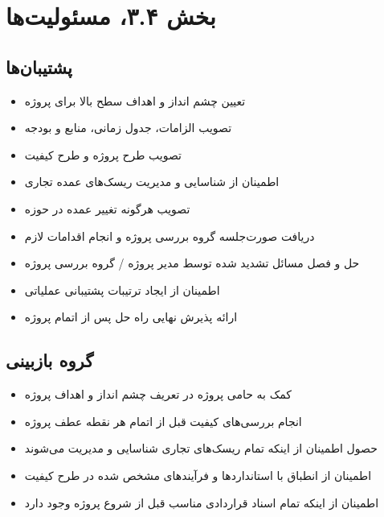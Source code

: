 \chapter{بخش ۳.۴، مسئولیت‌ها}

\section{پشتیبان‌ها}
\begin{itemize}
\item تعیین چشم انداز و اهداف سطح بالا برای پروژه
\item تصویب الزامات، جدول زمانی، منابع و بودجه
\item تصویب طرح پروژه و طرح کیفیت
\item اطمینان از شناسایی و مدیریت ریسک‌های عمده تجاری
\item تصویب هرگونه تغییر عمده در حوزه
\item دریافت صورت‌جلسه گروه بررسی پروژه و انجام اقدامات لازم
\item حل و فصل مسائل تشدید شده توسط مدیر پروژه / گروه بررسی پروژه
\item اطمینان از ایجاد ترتیبات پشتیبانی عملیاتی
\item ارائه پذیرش نهایی راه حل پس از اتمام پروژه
\end{itemize}

\section{گروه بازبینی}
\begin{itemize}
\item کمک به حامی پروژه در تعریف چشم انداز و اهداف پروژه
\item انجام بررسی‌های کیفیت قبل از اتمام هر نقطه عطف پروژه
\item حصول اطمینان از اینکه تمام ریسک‌های تجاری شناسایی و مدیریت می‌شوند
\item اطمینان از انطباق با استانداردها و فرآیندهای مشخص شده در طرح کیفیت
\item اطمینان از اینکه تمام اسناد قراردادی مناسب قبل از شروع پروژه وجود دارد
\end{itemize}

